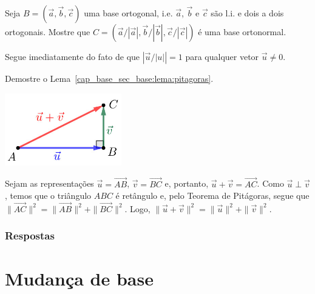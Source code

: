 \begin{exer}
  Seja $B = (\vec{a}, \vec{b}, \vec{c})$ uma base ortogonal, i.e. $\vec{a}$, $\vec{b}$ e $\vec{c}$ são l.i. e dois a dois ortogonais. Mostre que $C = (\vec{a}/|\vec{a}|,\vec{b}/|\vec{b}|,\vec{c}/|\vec{c}|)$ é uma base ortonormal.
\end{exer}
\begin{resp}
  Segue imediatamente do fato de que $\left|\vec{u}/|u|\right|=1$ para qualquer vetor $\vec{u}\neq 0$.
\end{resp}

\begin{exer}\label{cap_base_sec_base:exer:pitagoras}
  Demostre o Lema~\ref{cap_base_sec_base:lema:pitagoras}.
\end{exer}
\begin{resp}

  \includegraphics[width=2in]{./cap_base/dados/fig_pitagoras/fig.jpg}
  
  Sejam as representações $\vec{u}=\overrightarrow{AB}$, $\vec{v}=\overrightarrow{BC}$ e, portanto, $\vec{u}+\vec{v}=\overrightarrow{AC}$. Como $\vec{u}\perp\vec{v}$, temos que o triângulo $ABC$ é retângulo e, pelo Teorema de Pitágoras, segue que $\|\overrightarrow{AC}\|^2=\|\overrightarrow{AB}\|^2+\|\overrightarrow{BC}\|^2$. Logo, $\|\vec{u}+\vec{v}\|^2 = \|\vec{u}\|^2 + \|\vec{v}\|^2$.
\end{resp}

\ifisbook
\subsubsection{Respostas}
\shipoutAnswer
\fi

\section{Mudança de base}\label{cap_base_sec_mudbas}
\badgeRevisar

